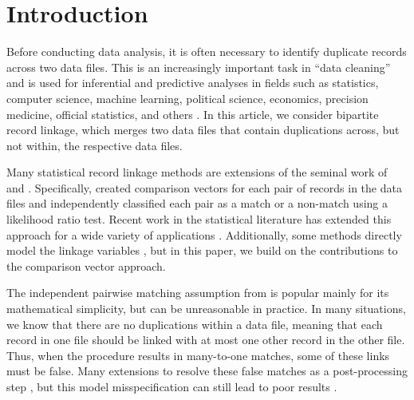 \documentclass[ba]{imsart}
\begin{document}
\begin{frontmatter}
\begin{abstract}
\end{abstract}

\begin{keyword}%
\end{keyword}

\end{frontmatter}






\section{Introduction}
\label{sec:introduction}

Before conducting data analysis, it is often necessary to identify duplicate records across two data files. This is an increasingly important task in ``data cleaning'' and is used for inferential and predictive analyses in fields such as statistics, computer science, machine learning, political science, economics, precision medicine, official statistics, and others \citep{christen_2012, gutman2013bayesian, DalzellReiter18, tang2020}. In this article, we consider bipartite record linkage, which merges two data files that contain duplications across, but not within, the respective data files. 

Many statistical record linkage methods are extensions of the seminal work of \cite{fellegi_theory_1969} and \cite{newcombe_automatic_1959}. Specifically, \cite{fellegi_theory_1969} created comparison vectors for each pair of records in the data files and independently classified each pair as a match or a non-match using a likelihood ratio test. Recent work in the statistical literature has extended this approach for a wide variety of applications \citep{Winkler1990, fair2004generalized, wagner2014person, gill2003english, enamorado2019using, aleshinguendel2021multifile}. Additionally, some methods directly model the linkage variables \citep{steorts_bayesian_2016, marchant_distributed_2019, betancourt2021prior}, but in this paper, we build on the contributions to the comparison vector approach. 


The independent pairwise matching assumption from \cite{fellegi_theory_1969} is popular mainly for its mathematical simplicity, but can be unreasonable in practice. In many situations, we know that there are no duplications within a data file, meaning that each record in one file should be linked with at most one other record in the other file. Thus, when the procedure results in many-to-one matches, some of these links must be false. Many extensions to \cite{fellegi_theory_1969} resolve these false matches as a post-processing step \citep{jaro1989}, but this model misspecification can still lead to poor results \citep{sadinle_bayesian_2017}.
\end{document}
